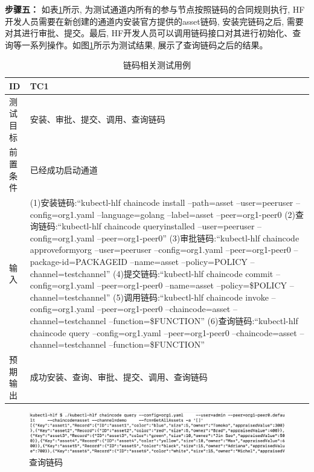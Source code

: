 \textbf{步骤五：} 如表\ref{chaincode_test}所示, 为测试通道内所有的参与节点按照链码的合同规则执行, HF开发人员需要在新创建的通道内安装官方提供的asset\footnotemark[1]链码, 安装完链码之后, 需要对其进行审批、提交。最后, HF开发人员可以调用链码接口对其进行初始化、查询等一系列操作。如图\ref{chaincode_test_result}所示为测试结果, 展示了查询链码之后的结果。

{\footnotesize
\begin{longtable}[h]{m{60pt}|m{280pt}}
    \caption[链码相关测试用例]{链码相关测试用例} \label{chaincode_test}\\
        \hline  
        ID&TC1\\
        \hline
        测试目标&安装、审批、提交、调用、查询链码\\
        \hline
        前置条件&已经成功启动通道\\
        \hline
        输入& (1)安装链码:“kubectl-hlf chaincode install --path=asset --user=peeruser --config=org1.yaml --language=golang --label=asset --peer=org1-peer0
        \newline (2)查询链码:“kubectl-hlf chaincode queryinstalled --user=peeruser --config=org1.yaml --peer=org1-peer0”
        \newline (3)审批链码:“kubectl-hlf chaincode approveformyorg --user=peeruser --config=org1.yaml --peer=org1-peer0 --package-id=PACKAGEID --name=asset --policy=POLICY --channel=testchannel”
        \newline (4)提交链码:“kubectl-hlf chaincode commit --config=org1.yaml --peer=org1-peer0 --name=asset --policy=\$POLICY --channel=testchannel”
        \newline (5)调用链码:“kubectl-hlf chaincode invoke --config=org1.yaml --peer=org1-peer0 --chaincode=asset --channel=testchannel --function=\$FUNCTION”
        \newline (6)查询链码:“kubectl-hlf chaincode query --config=org1.yaml --peer=org1-peer0 --chaincode=asset --channel=testchannel --function=\$FUNCTION”\\
        \hline 
        预期输出& 成功安装、查询、审批、提交、调用、查询链码\\
        \hline
    \end{longtable} 
}

\begin{figure}[h] %
    \centering %
    \includegraphics[width=1.0\textwidth]{FIGs/chapter5/chaincode.png} %
    \caption{查询链码} %
    \label{chaincode_test_result} %
\end{figure}%



